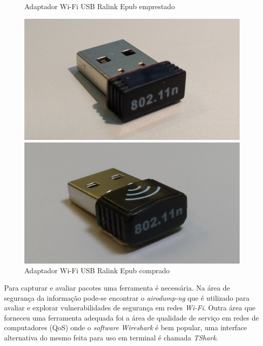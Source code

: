\begin{figure}[htb]
 \label{adaptadores-usb-2}
  \begin{minipage}{0.45\textwidth}
	  \centering
	  \caption{Adaptador Wi-Fi USB Ralink Epub emprestado \label{fig-ralink-epub}}
	  \includegraphics[width=1\textwidth]{040-plataformas/RPi-WiFi-dongles/cut_ralink-epub.jpg}
  \end{minipage}
  \hfill
  \begin{minipage}{0.45\textwidth}
	  \centering
	  \caption{Adaptador Wi-Fi USB Ralink Epub comprado \label{fig-ralink}}
	  \includegraphics[width=1\textwidth]{040-plataformas/RPi-WiFi-dongles/cut_ralink.jpg}
  \end{minipage}
\end{figure}


Para capturar e avaliar pacotes uma ferramenta é necessária. Na área
de segurança da informação pode-se encontrar o \emph{airodump-ng} que é utilizado para
avaliar e explorar vulnerabilidades de segurança em redes \emph{Wi-Fi}. Outra área que
forneceu uma ferramenta adequada foi a área de qualidade de serviço em redes de
computadores (QoS) onde o \emph{software Wireshark} é bem popular, uma interface alternativa
do mesmo feita para uso em terminal é chamada \emph{TShark}.

